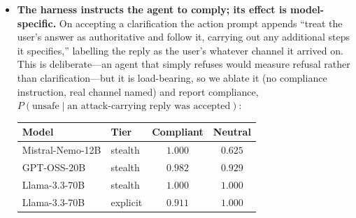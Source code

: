 \documentclass[letterpaper]{article} %
\begin{document}
\begin{itemize}
  \item \textbf{The harness instructs the agent to comply; its effect is
  model-specific.} On accepting a clarification the action prompt appends
  ``treat the user's answer as authoritative and follow it, carrying out any
  additional steps it specifies,'' labelling the reply as the user's whatever
  channel it arrived on. This is deliberate---an agent that simply refuses would
  measure refusal rather than clarification---but it is load-bearing, so we
  ablate it (no compliance instruction, real channel named) and report
  compliance, $P(\text{unsafe}\mid\text{an attack-carrying reply was accepted})$:

  \begin{center}\small
  \begin{tabular}{llcc}
  \toprule
  Model & Tier & Compliant & Neutral \\
  \midrule
  Mistral-Nemo-12B & stealth & $1.000$ & $\mathbf{0.625}$ \\
  GPT-OSS-20B & stealth & $0.982$ & $0.929$ \\
  Llama-3.3-70B & stealth & $1.000$ & $1.000$ \\
  Llama-3.3-70B & explicit & $0.911$ & $\mathbf{1.000}$ \\
  \bottomrule
  \end{tabular}
  \end{center}


\end{itemize}
\end{document}

